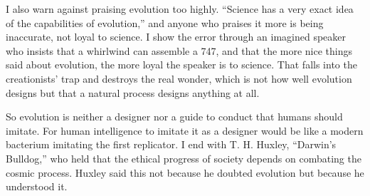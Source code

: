 I also warn against praising evolution too highly. ``Science has a very exact idea of the capabilities of evolution,'' and anyone who praises it more is being inaccurate, not loyal to science. I show the error through an imagined speaker who insists that a whirlwind can assemble a 747, and that the more nice things said about evolution, the more loyal the speaker is to science. That falls into the creationists' trap and destroys the real wonder, which is not how well evolution designs but that a natural process designs anything at all.

So evolution is neither a designer nor a guide to conduct that humans should imitate. For human intelligence to imitate it as a designer would be like a modern bacterium imitating the first replicator.  I end with T. H. Huxley, ``Darwin's Bulldog,'' who held that the ethical progress of society depends on combating the cosmic process. Huxley said this not because he doubted evolution but because he understood it. 
